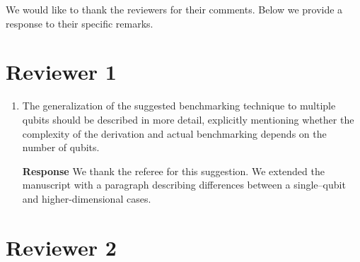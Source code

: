 \documentclass[a4paper,12pt]{article}
\newcommand{\1}{{\rm 1\hspace{-0.9mm}l}}
\newenvironment{response}{\vspace{1em}\noindent\textbf{Response}}{\vspace{1em}}
\begin{document}
We would like to thank the reviewers for their comments. Below we provide
a response to their specific remarks.

\section{Reviewer 1}

\begin{enumerate}

  \item The generalization of the suggested benchmarking technique to multiple qubits should be described in more detail, 
        explicitly mentioning whether the complexity of the derivation and actual benchmarking depends on the number of 
        qubits.

  \begin{response}
  We thank the referee for this suggestion. We extended the manuscript with a paragraph describing differences between
  a single--qubit and higher-dimensional cases.
  \end{response}

\end{enumerate}
\section{Reviewer 2}
\end{document}
